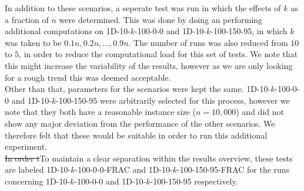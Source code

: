 \documentclass{article}
\newcommand{\fbrm}[1]{{\color{blue}\st{#1}}}
\begin{document}
In addition to these scenarios, a seperate test was run in which the effects of $k$ as a fraction of $n$ were determined. This was done by doing an performing additional computations on 1D-10-$k$-100-0-0 and 1D-10-$k$-100-150-95, in which $k$ was taken to be $0.1n, 0.2n, ..., 0.9n$. The number of runs was also reduced from $10$ to $5$, in order to reduce the computational load for this set of tests. We note that this might increase the variability of the results, however as we are only looking for a rough trend this was deemed acceptable.\\ Other than that, parameters for the scenarios were kept the same. 1D-10-$k$-100-0-0 and 1D-10-$k$-100-150-95 were arbitrarily selected for this process, however we note that they both have a reasonable instance size ($n=10,000$) and did not show any major deviation from the performance of the other scenarios. We therefore felt that these would be suitable in order to run this additional experiment. \\
\fbrm{In order t}To maintain a clear separation within the results overview, these tests are labeled 1D-10-$k$-100-0-0-FRAC and 1D-10-$k$-100-150-95-FRAC for the runs concerning 1D-10-$k$-100-0-0 and 1D-10-$k$-100-150-95 respectively.
\end{document}

